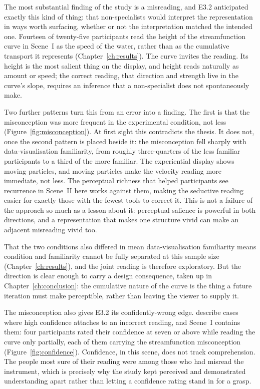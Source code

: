 The most substantial finding of the study is a misreading, and E3.2 anticipated exactly this kind of thing: that non-specialists would interpret the representation in ways worth surfacing, whether or not the interpretation matched the intended one. Fourteen of twenty-five participants read the height of the streamfunction curve in Scene~I as the speed of the water, rather than as the cumulative transport it represents (Chapter~\ref{ch:results}). The curve invites the reading. Its height is the most salient thing on the display, and height reads naturally as amount or speed; the correct reading, that direction and strength live in the curve's slope, requires an inference that a non-specialist does not spontaneously make.

Two further patterns turn this from an error into a finding. The first is that the misconception was more frequent in the experimental condition, not less (Figure~\ref{fig:misconception}). At first sight this contradicts the thesis. It does not, once the second pattern is placed beside it: the misconception fell sharply with data-visualisation familiarity, from roughly three-quarters of the less familiar participants to a third of the more familiar. The experiential display shows moving particles, and moving particles make the velocity reading more immediate, not less. The perceptual richness that helped participants see recurrence in Scene~II here works against them, making the seductive reading easier for exactly those with the fewest tools to correct it. This is not a failure of the approach so much as a lesson about it: perceptual salience is powerful in both directions, and a representation that makes one structure vivid can make an adjacent misreading vivid too.

That the two conditions also differed in mean data-visualisation familiarity means condition and familiarity cannot be fully separated at this sample size (Chapter~\ref{ch:results}), and the joint reading is therefore exploratory. But the direction is clear enough to carry a design consequence, taken up in Chapter~\ref{ch:conclusion}: the cumulative nature of the curve is the thing a future iteration must make perceptible, rather than leaving the viewer to supply it.

The misconception also gives E3.2 its confidently-wrong edge. \textcite{fischer2020} describe cases where high confidence attaches to an incorrect reading, and Scene~I contains them: four participants rated their confidence at seven or above while reading the curve only partially, each of them carrying the streamfunction misconception (Figure~\ref{fig:confidence}). Confidence, in this scene, does not track comprehension. The people most sure of their reading were among those who had misread the instrument, which is precisely why the study kept perceived and demonstrated understanding apart rather than letting a confidence rating stand in for a grasp.

